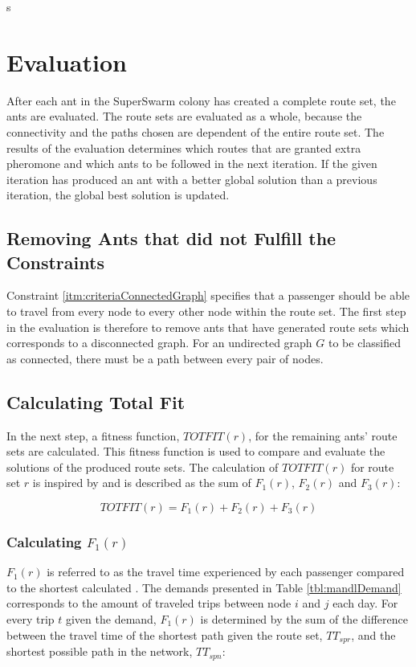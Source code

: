 s\section{Evaluation}
\label{sec:algoEvaluation}
After each ant in the SuperSwarm colony has created a complete route set, the ants are evaluated. The route sets are evaluated as a whole, because the connectivity and the paths chosen are dependent of the entire route set. The results of the evaluation determines which routes that are granted extra pheromone and which ants to be followed in the next iteration. If the given iteration has produced an ant with a better global solution than a previous iteration, the global best solution is updated.

\subsection{Removing Ants that did not Fulfill the Constraints}
\label{sec:algoRemoval}
Constraint \vref{itm:criteriaConnectedGraph} specifies that a passenger should be able to travel from every node to every other node within the route set. The first step in the evaluation is therefore to remove ants that have generated route sets which corresponds to a disconnected graph. For an undirected graph $G$ to be classified as connected, there must be a path between every pair of nodes. 

\subsection{Calculating Total Fit}
\label{sec:totfit}
In the next step, a fitness function, $TOTFIT(r)$, for the remaining ants' route sets are calculated. This fitness function is used to compare and evaluate the solutions of the produced route sets. The calculation of $TOTFIT(r)$ for route set $r$ is inspired by \citet{kechagiopoulos14} and is described as the sum of $F_{1}(r)$, $F_{2}(r)$ and $F_{3}(r)$: 

$$ TOTFIT(r) = F_{1}(r) + F_{2}(r) + F_{3}(r)$$

\subsubsection{Calculating $F_{1}(r)$}
\label{sec:f1}
$F_{1}(r)$ is referred to as the travel time experienced by each passenger compared to the shortest calculated . The demands presented in Table \vref{tbl:mandlDemand} corresponds to the amount of traveled trips between node $i$ and $j$ each day. For every trip $t$ given the demand, $F_{1}(r)$ is determined by the sum of the difference between the travel time of the shortest path given the route set, $TT_{spr}$, and the shortest possible path in the network, $TT_{spn}$:

